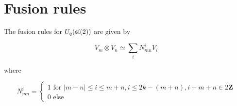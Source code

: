 \section{Fusion rules}

The fusion rules for $U_q(\mathfrak{sl}(2))$ are given by 

\begin{equation}
    V_m \otimes V_n \simeq \sum_i N_{mn}^i V_i
\end{equation}

where 

\begin{equation}
    N_{mn}^i = \begin{cases} 1 \text{ for } |m-n| \leq i \leq m+n, i \leq 2k - (m+n), i + m + n \in 2 \mathbf{Z} \\
                             0 \text{ else } 
               \end{cases}
\end{equation}



